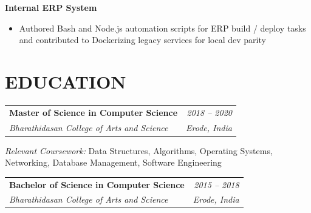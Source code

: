 \documentclass[11pt]{article}
\makeatletter
\newcommand{\resumeSubheading}[4]{
    \vspace{0.5pt}
    \begin{tabularx}{\textwidth}{@{}X r@{}}
        \textbf{\color{textgray}#1} & \color{textgray}\textit{#2} \\
        \textit{#3} & \textit{#4}
    \end{tabularx}
    \vspace{0.5pt}
}
\newcommand{\projectheading}[1]{
    \vspace{0.5pt}
    \textbf{\color{accentblue}#1}
    \vspace{0.5pt}
}
\makeatother
\begin{document}
\projectheading{Internal ERP System}
\begin{itemize}
    \item Authored Bash and Node.js automation scripts for ERP build / deploy tasks and contributed to Dockerizing legacy services for local dev parity
\end{itemize}

\section*{EDUCATION}

\resumeSubheading
    {Master of Science in Computer Science}{2018 -- 2020}
    {Bharathidasan College of Arts and Science}{Erode, India}

\textit{Relevant Coursework:} Data Structures, Algorithms, Operating Systems, Networking, Database Management, Software Engineering

\vspace{2pt}

\resumeSubheading
    {Bachelor of Science in Computer Science}{2015 -- 2018}
    {Bharathidasan College of Arts and Science}{Erode, India}
\end{document}
